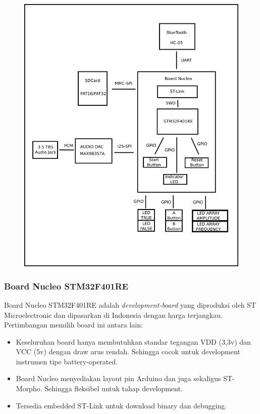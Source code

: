 \documentclass[12pt,]{article}
\begin{document}
	\begin{figure}[!ht]
		\centering
		\includegraphics[width=400pt]{images/overview}
	\end{figure}
	
	\newpage
	\subsubsection{Board Nucleo STM32F401RE}
	
	Board Nucleo STM32F401RE adalah \textit{development-board} yang diproduksi oleh ST Microelectronic
	dan dipasarkan di Indonesia dengan harga terjangkau.
	Pertimbangan memilih board ini antara lain:
	\begin{itemize}
		\item Keseluruhan board hanya membutuhkan standar tegangan VDD (3,3v) dan VCC (5v) dengan draw arus rendah.
		Sehingga cocok untuk development instrumen tipe battery-operated.
		
		\item Board Nucleo menyediakan layout pin Arduino dan juga sekaligus ST-Morpho.
		Sehingga fleksibel untuk tahap development.
	
		\item Tersedia embedded ST-Link untuk download binary dan debugging.
	\end{itemize}
\end{document}
